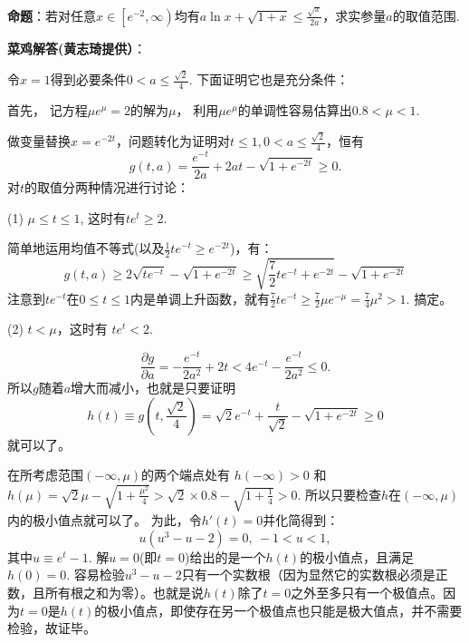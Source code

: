 \documentclass[12pt,CJK]{article}
\begin{document}
\bch

{\bf \blue 命题}：若对任意$x\in \left[e^{-2}, \infty\right)$均有$a \ln x + \sqrt{1+x}\le \frac{\sqrt{x}}{2a}$，求实参量$a$的取值范围.

  \skipline
  
  {\bf \blue 菜鸡解答(黄志琦提供）}：

  令$x=1$得到必要条件$0<a\le \frac{\sqrt{2}}{4}$. 下面证明它也是充分条件：

  首先，  记方程$\mu e^\mu = 2$的解为$\mu$， 利用$\mu e^\mu$的单调性容易估算出$0.8<\mu<1$.
  
  做变量替换$x=e^{-2t}$，问题转化为证明对$t\le 1, 0<a\le \frac{\sqrt{2}}{4}$，恒有
  $$g(t, a) =   \frac{e^{-t}}{2a} + 2at  - \sqrt{1+e^{-2t}}\ge 0.$$
  对$t$的取值分两种情况进行讨论：

  (1) $\mu \le t \le 1$, 这时有$te^t\ge 2$.

  简单地运用均值不等式(以及$\frac{1}{2}te^{-t}\ge e^{-2t}$)，有：
   $$g(t,a)\ge 2\sqrt{te^{-t}} - \sqrt{1+e^{-2t}}\ge \sqrt{\frac{7}{2}te^{-t}+e^{-2t}} - \sqrt{1+e^{-2t}}  $$
  注意到$te^{-t}$在$ 0\le t\le 1$内是单调上升函数，就有$\frac{7}{2}te^{-t}\ge \frac{7}{2}\mu e^{-\mu} = \frac{7}{4}\mu^2 > 1$. 搞定。

  
  (2) $t<\mu$，这时有 $te^t<2$.

  $$\frac{\partial g}{\partial a} = -\frac{e^{-t}}{2a^2}+2t < 4e^{-t}-\frac{e^{-t}}{2a^2}  \le 0. $$
  所以$g$随着$a$增大而减小，也就是只要证明
  $$h(t)\equiv g(t, \frac{\sqrt{2}}{4}) = \sqrt{2}e^{-t} + \frac{t}{\sqrt{2}} - \sqrt{1+e^{-2t}}\ge 0$$
  就可以了。

  在所考虑范围$(-\infty, \mu)$的两个端点处有 $h(-\infty)>0$ 和 $h(\mu) = \sqrt{2}\mu -\sqrt{1+\frac{\mu^2}{4}}> \sqrt{2}\times 0.8 - \sqrt{1+\frac{1}{4}} > 0.$ 所以只要检查$h$在$(-\infty, \mu)$内的极小值点就可以了。 为此，令$h'(t) =0$并化简得到：
  $$ u (u^3 - u- 2) = 0, \ -1<u<1,$$
  其中$u\equiv e^t - 1$. 解$u=0$(即$t=0$)给出的是一个$h(t)$的极小值点，且满足$h(0)=0$. 容易检验$u^3-u-2$只有一个实数根（因为显然它的实数根必须是正数，且所有根之和为零）。也就是说$h(t)$除了$t=0$之外至多只有一个极值点。因为$t=0$是$h(t)$的极小值点，即使存在另一个极值点也只能是极大值点，并不需要检验，故证毕。

  
\ech
\end{document}
